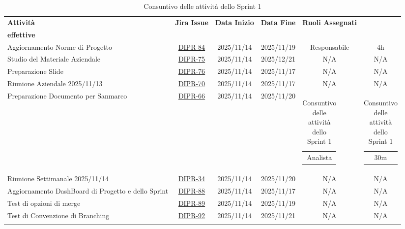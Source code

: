 \documentclass[a4paper,12pt]{article}
\begin{document}
    \small
    \begin{spacing}{1}
        \begin{longtable}{|p{4cm}|c|c|c|c|c|}
        \hline
        \rowcolor{zpusgreen!30}
        \textbf{Attività} & \textbf{Jira Issue} & \textbf{Data Inizio} & \textbf{Data Fine} & \textbf{Ruoli Assegnati} & \begin{tabular}[c]{@{}c@{}} \textbf{Ore} \\ \textbf{effettive} \end{tabular} \\
        \hline
        Aggiornamento Norme di Progetto & \href{https://7zpus.atlassian.net/browse/DIPR-84}{DIPR-84} & 2025/11/14 & 2025/11/19 & Responsabile & 4h \\
        \hline
        Studio del Materiale Aziendale & \href{https://7zpus.atlassian.net/browse/DIPR-75}{DIPR-75} & 2025/11/14 & 2025/12/21 & N/A & N/A \\
        \hline
        Preparazione Slide & \href{https://7zpus.atlassian.net/browse/DIPR-76}{DIPR-76} & 2025/11/14 & 2025/11/17 & N/A & N/A\\
        \hline
        Riunione Aziendale 2025/11/13 & \href{https://7zpus.atlassian.net/browse/DIPR-70}{DIPR-70} & 2025/11/14 & 2025/11/17 & N/A & N/A\\
        \hline
        Preparazione Documento per Sanmarco& \href{https://7zpus.atlassian.net/browse/DIPR-66}{DIPR-66}& 2025/11/14& 2025/11/20& \begin{tabular}[c]{@{}c@{}} Analista \end{tabular} & \begin{tabular}[c]{@{}c@{}} 30m \end{tabular} \\
        \hline
        Riunione Settimanale 2025/11/14 & \href{https://7zpus.atlassian.net/browse/DIPR-34}{DIPR-34} & 2025/11/14 & 2025/11/20 & N/A & N/A \\
        \hline
        Aggiornamento DashBoard  di Progetto e dello Sprint & \href{https://7zpus.atlassian.net/browse/DIPR-88}{DIPR-88} & 2025/11/14 & 2025/11/17 & N/A & N/A \\
        \hline
        Test di opzioni di merge & \href{https://7zpus.atlassian.net/browse/DIPR-89}{DIPR-89} & 2025/11/14 & 2025/11/19 & N/A & N/A \\
        \hline
        Test di Convenzione di Branching & \href{https://7zpus.atlassian.net/browse/DIPR-92}{DIPR-92} & 2025/11/14 & 2025/11/21 & N/A & N/A \\\hline
        \rowcolor{white}
        \caption{Consuntivo delle attività dello Sprint 1}
    
    \end{longtable}
    \end{spacing}
\end{document}
